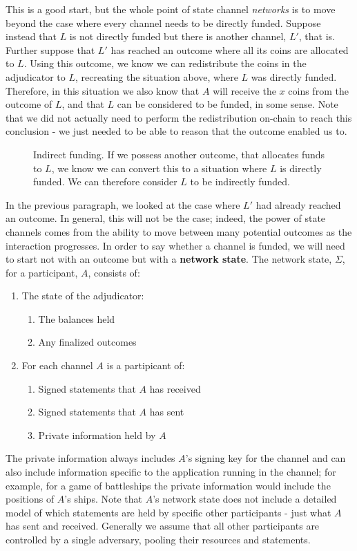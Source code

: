 This is a good start, but the whole point of state channel \textit{networks} is to move beyond the case where every channel needs to be directly funded.
Suppose instead that $L$ is not directly funded but there is another channel, $L'$, that is.
Further suppose that $L'$ has reached an outcome where all its coins are allocated to $L$.
Using this outcome, we know we can redistribute the coins in the adjudicator to $L$, recreating the situation above, where $L$ was directly funded.
Therefore, in this situation we also know that $A$ will receive the $x$ coins from the outcome of $L$, and that $L$ can be considered to be funded, in some sense.
Note that we did not actually need to perform the redistribution on-chain to reach this conclusion - we just needed to be able to reason that the outcome enabled us to.

\begin{figure}[h]\centering
  \makebox[\textwidth][c]{}
  \caption{
    Indirect funding.
    If we possess another outcome, that allocates funds to $L$, we know we can convert this to a situation where $L$ is directly funded.
    We can therefore consider $L$ to be indirectly funded.
  }\label{fig:indirect-funding}
\end{figure}

In the previous paragraph, we looked at the case where $L'$ had already reached an outcome.
In general, this will not be the case;
indeed, the power of state channels comes from the ability to move between many potential outcomes as the interaction progresses.
In order to say whether a channel is funded, we will need to start not with an outcome but with a \textbf{network state}.
The network state, $\Sigma$, for a participant, $A$, consists of:
\begin{enumerate}
  \item The state of the adjudicator: 
  \begin{enumerate}
    \item The balances held
    \item Any finalized outcomes
  \end{enumerate}
  \item For each channel $A$ is a partipicant of:
  \begin{enumerate}
    \item Signed statements that $A$ has received
    \item Signed statements that $A$ has sent
    \item Private information held by $A$
  \end{enumerate}
\end{enumerate}
The private information always includes $A$'s signing key for the channel and can also include information specific to the application running in the channel;
for example, for a game of battleships the private information would include the positions of $A$'s ships.
Note that $A$'s network state does not include a detailed model of which statements are held by specific other participants - just what $A$ has sent and received.
Generally we assume that all other participants are controlled by a single adversary, pooling their resources and statements. 

